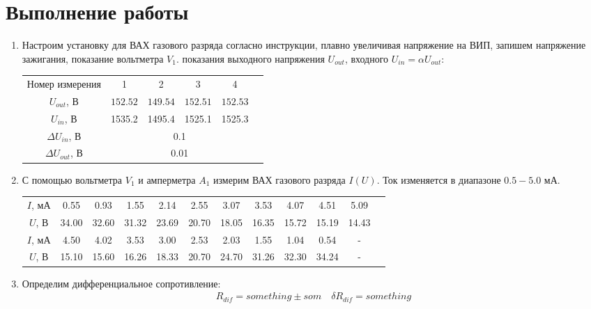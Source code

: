 \documentclass[a4paper, 12pt]{article}
\begin{document}
\section*{Выполнение работы}
\begin{enumerate}
    \item Настроим установку для ВАХ газового разряда согласно инструкции, плавно увеличивая напряжение на ВИП, запишем напряжение
    зажигания, показание вольтметра $V_{1}$. показания выходного напряжения $U_{out}$, входного $U_{in} = \alpha U_{out}$:
    \begin{center}
        \begin{tabular}{|c|c|c|c|c|c|}
            \hline
            Номер измерения & 1 & 2 & 3 & 4\\
            $U_{out}$, В & $152.52$ & $149.54$ & $152.51$ & $152.53$\\
            $U_{in}$, В & 1535.2 & 1495.4 & 1525.1 & 1525.3\\
            \hline
            $\Delta U_{in}$, В & \multicolumn{4}{|c|}{0.1}\\
            $\Delta U_{out}$, В & \multicolumn{4}{|c|}{0.01}\\
            \hline
        \end{tabular}
    \end{center}
    \item С помощью вольтметра $V_{1}$ и амперметра $A_{1}$ измерим ВАХ газового разряда $I(U)$. Ток изменяется в диапазоне $0.5 - 5.0$ мА.
    \begin{center}
        \begin{tabular}{|c|c|c|c|c|c|c|c|c|c|c|c|}
            \hline
            $I$, мА & 0.55 & 0.93 & 1.55 & 2.14 & 2.55 & 3.07 & 3.53 & 4.07 & 4.51 & 5.09\\
            $U$, В & 34.00 & 32.60 & 31.32 & 23.69 & 20.70 & 18.05 & 16.35 & 15.72 & 15.19 & 14.43\\
            \hline
            $I$, мА & 4.50 & 4.02 & 3.53 & 3.00 & 2.53 & 2.03 & 1.55 & 1.04 & 0.54 & -\\
            $U$, В & 15.10 & 15.60 & 16.26 & 18.33 & 20.70 & 24.70 & 31.26 & 32.30 & 34.24 & -\\
            \hline
        \end{tabular}
    \end{center}
    \item Определим дифференциальное сопротивление:
    \begin{align}
        R_{dif} = something \pm som \quad \delta R_{dif} = something

\end{align}
\end{enumerate}
\end{document}
